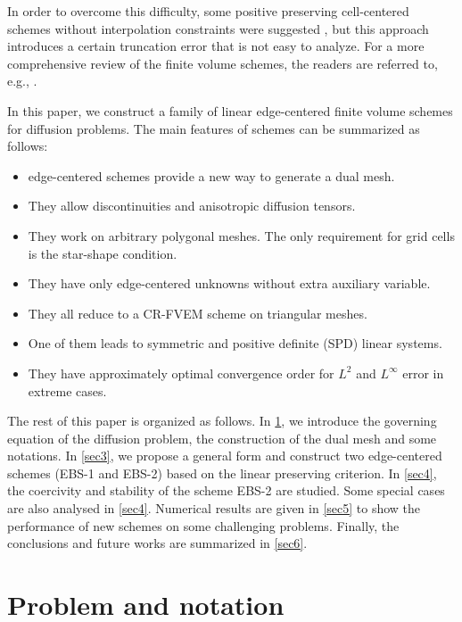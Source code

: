 \documentclass[times,review,preprint,authoryear]{elsarticle}
\begin{document}
In order to overcome this difficulty, some positive preserving cell-centered schemes without interpolation constraints were suggested \cite{J. Wu-Z. Gao, Z. Gao-J. Wu, Schneider2017}, but this approach introduces a certain  truncation error that is not easy to analyze. For a more  comprehensive review of the finite volume schemes, the readers are referred to, e.g., \cite{Droniou2014, Schneider2018}.









In this paper, we construct a family of linear edge-centered finite volume schemes for diffusion problems. The main features of schemes can be summarized as follows:
\begin{itemize}
\item edge-centered schemes provide a new way to generate a dual mesh.
\item They allow discontinuities and anisotropic diffusion tensors.
\item They work on arbitrary polygonal meshes. The only requirement for grid cells is the star-shape condition.
\item They have only edge-centered unknowns without extra auxiliary variable.
\item They all reduce to a CR-FVEM scheme on triangular meshes.
\item One of them leads to symmetric and positive definite (SPD) linear systems.
\item They have approximately optimal convergence order for $L^2$ and $L^\infty$ error in extreme cases.
\end{itemize}

The rest of this paper is organized as follows. In \cref{sec2}, we introduce the governing equation of the diffusion problem, the construction of the dual mesh and some notations. In \cref{sec3}, we propose a general form and construct two edge-centered schemes (EBS-1 and EBS-2) based on the linear preserving criterion. In \cref{sec4}, the coercivity and stability of the scheme EBS-2 are studied. Some special cases are also analysed in \cref{sec4}. Numerical results are given in \cref{sec5} to show the performance of new schemes on some challenging problems. Finally, the conclusions and future works are summarized in \cref{sec6}.

\section{Problem and notation}\label{sec2}
\end{document}
